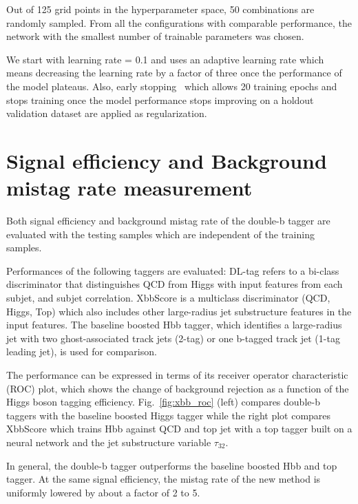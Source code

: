 \par Out of 125 grid points in the hyperparameter space, 50 combinations are randomly sampled. From all the configurations with comparable performance, the network with the smallest number of trainable parameters was chosen. 
\par We start with learning rate = 0.1 and uses an adaptive learning rate which means decreasing the learning rate by a factor of three once the performance of the model plateaus. Also, early stopping~\cite{Yao07onearly} which allows 20 training epochs and stops training once the model performance stops improving on a holdout validation dataset are applied as regularization. 

\section{Signal efficiency and Background mistag rate measurement}
\label{sec:per}

\par Both signal efficiency and background mistag rate of the double-b tagger are evaluated with the testing samples which are independent of the training samples.

\par Performances of the following taggers are evaluated: DL-tag refers to a bi-class discriminator that distinguishes QCD from Higgs with input features from each subjet, and subjet correlation. 
XbbScore is a multiclass discriminator (QCD, Higgs, Top) which also includes other large-radius jet substructure features in the input features. 
The baseline boosted Hbb tagger, which identifies a large-radius jet with two ghost-associated track jets (2-tag) or one b-tagged track jet (1-tag leading jet), is used for comparison.
\par The performance can be expressed in terms of its receiver operator characteristic (ROC) plot, which shows the change of background rejection as a function of the Higgs boson tagging efficiency. Fig.~\ref{fig:xbb_roc} (left) compares double-b taggers with the baseline boosted Higgs tagger while the right plot compares XbbScore which trains Hbb against QCD and top jet with a top tagger built on a neural network and the jet substructure variable $\tau_{32}$.
\par In general, the double-b tagger outperforms the baseline boosted Hbb and top tagger. At the same signal efficiency, the mistag rate of the new method is uniformly lowered by about a factor of 2 to 5.

